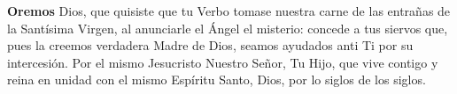 \textbf{Oremos}
 Dios, que quisiste que tu Verbo tomase nuestra carne de las entrañas de la Santísima Virgen, al anunciarle el Ángel el misterio: concede a tus siervos que, pues
la creemos verdadera Madre de Dios, seamos ayudados anti Ti por su intercesión. Por el mismo Jesucristo Nuestro Señor, Tu Hijo, que vive contigo y reina en unidad con el mismo Espíritu
Santo, Dios, por lo siglos de los siglos.